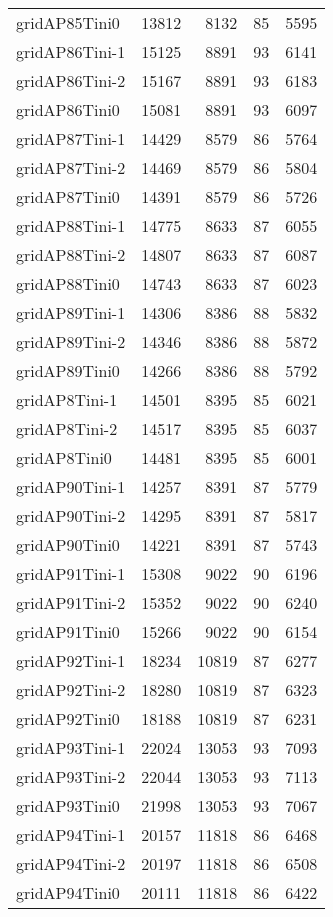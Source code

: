 \documentclass[../../../thesis.tex]{subfiles}
\begin{document}
\begin{longtable}{lrrrr}
gridAP85Tini0 & 13812 & 8132 & 85 & 5595 \\
gridAP86Tini-1 & 15125 & 8891 & 93 & 6141 \\
gridAP86Tini-2 & 15167 & 8891 & 93 & 6183 \\
gridAP86Tini0 & 15081 & 8891 & 93 & 6097 \\
gridAP87Tini-1 & 14429 & 8579 & 86 & 5764 \\
gridAP87Tini-2 & 14469 & 8579 & 86 & 5804 \\
gridAP87Tini0 & 14391 & 8579 & 86 & 5726 \\
gridAP88Tini-1 & 14775 & 8633 & 87 & 6055 \\
gridAP88Tini-2 & 14807 & 8633 & 87 & 6087 \\
gridAP88Tini0 & 14743 & 8633 & 87 & 6023 \\
gridAP89Tini-1 & 14306 & 8386 & 88 & 5832 \\
gridAP89Tini-2 & 14346 & 8386 & 88 & 5872 \\
gridAP89Tini0 & 14266 & 8386 & 88 & 5792 \\
gridAP8Tini-1 & 14501 & 8395 & 85 & 6021 \\
gridAP8Tini-2 & 14517 & 8395 & 85 & 6037 \\
gridAP8Tini0 & 14481 & 8395 & 85 & 6001 \\
gridAP90Tini-1 & 14257 & 8391 & 87 & 5779 \\
gridAP90Tini-2 & 14295 & 8391 & 87 & 5817 \\
gridAP90Tini0 & 14221 & 8391 & 87 & 5743 \\
gridAP91Tini-1 & 15308 & 9022 & 90 & 6196 \\
gridAP91Tini-2 & 15352 & 9022 & 90 & 6240 \\
gridAP91Tini0 & 15266 & 9022 & 90 & 6154 \\
gridAP92Tini-1 & 18234 & 10819 & 87 & 6277 \\
gridAP92Tini-2 & 18280 & 10819 & 87 & 6323 \\
gridAP92Tini0 & 18188 & 10819 & 87 & 6231 \\
gridAP93Tini-1 & 22024 & 13053 & 93 & 7093 \\
gridAP93Tini-2 & 22044 & 13053 & 93 & 7113 \\
gridAP93Tini0 & 21998 & 13053 & 93 & 7067 \\
gridAP94Tini-1 & 20157 & 11818 & 86 & 6468 \\
gridAP94Tini-2 & 20197 & 11818 & 86 & 6508 \\
gridAP94Tini0 & 20111 & 11818 & 86 & 6422 \\

\end{longtable}
\end{document}
